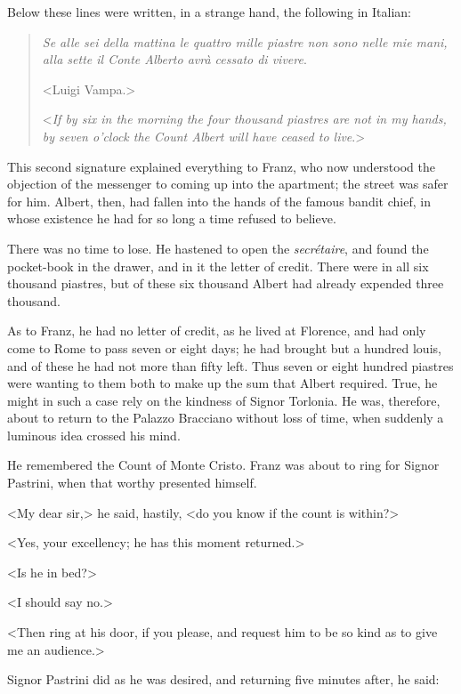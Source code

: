  Below these lines were written, in a strange hand, the following in Italian: 

\begin{quotation}
 \textit{Se alle sei della mattina le quattro mille piastre non sono nelle mie mani, alla sette il Conte Alberto avrà cessato di vivere}. 

 <Luigi Vampa.> 

 <\textit{If by six in the morning the four thousand piastres are not in my hands, by seven o'clock the Count Albert will have ceased to live}.> 
\end{quotation}

 This second signature explained everything to Franz, who now understood the objection of the messenger to coming up into the apartment; the street was safer for him. Albert, then, had fallen into the hands of the famous bandit chief, in whose existence he had for so long a time refused to believe. 

 There was no time to lose. He hastened to open the \textit{secrétaire}, and found the pocket-book in the drawer, and in it the letter of credit. There were in all six thousand piastres, but of these six thousand Albert had already expended three thousand. 

 As to Franz, he had no letter of credit, as he lived at Florence, and had only come to Rome to pass seven or eight days; he had brought but a hundred louis, and of these he had not more than fifty left. Thus seven or eight hundred piastres were wanting to them both to make up the sum that Albert required. True, he might in such a case rely on the kindness of Signor Torlonia. He was, therefore, about to return to the Palazzo Bracciano without loss of time, when suddenly a luminous idea crossed his mind. 

 He remembered the Count of Monte Cristo. Franz was about to ring for Signor Pastrini, when that worthy presented himself. 

 <My dear sir,> he said, hastily, <do you know if the count is within?> 

 <Yes, your excellency; he has this moment returned.> 

 <Is he in bed?> 

 <I should say no.> 

 <Then ring at his door, if you please, and request him to be so kind as to give me an audience.> 

 Signor Pastrini did as he was desired, and returning five minutes after, he said: 

